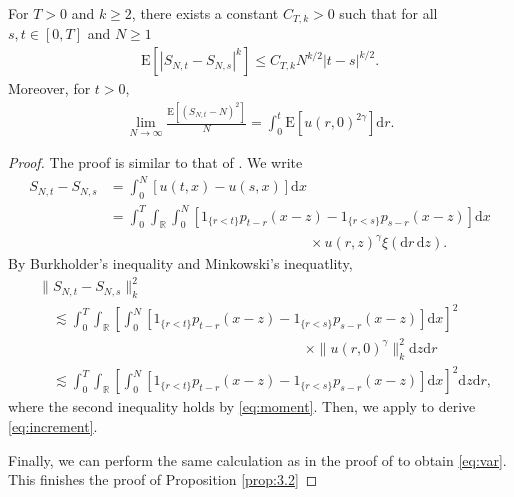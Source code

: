 \documentclass[12pt, reqno]{amsart}
\newcommand{\R}{{\mathbb{R}}}
\newcommand{\E}{\mathrm{E}}
\renewcommand{\d}{\mathrm{d}}
\newcommand{\<}{\langle}
\renewcommand{\>}{\rangle}
\begin{document}
\begin{proposition} \label{prop:3.2}
          For $T>0$ and $k\geq 2$,  there exists a constant $C_{T, k}>0$ such that for all $s, t \in [0, T]$ and $N\geq1$
          \begin{align}\label{eq:increment}
          \E \left[|S_{N,t}- S_{N,s}|^k\right]\leq C_{T,k}N^{k/2}|t-s|^{k/2}.
          \end{align}
          Moreover, for $t>0$,
          \begin{align}\label{eq:var}
          \lim_{N\to\infty}\frac{\E[(S_{N,t}-N)^2]}{N}=  \int_0^t \E\left[u(r,0)^{2\gamma}\right]\d r. 
          \end{align}
\end{proposition}
\begin{proof}
          The proof is similar to that of \cite[Proposition 4.1]{HNV20}. We write
          \begin{align*}
          S_{N,t}-S_{N,s}&= \int_0^N [u(t,x)-u(s,x)]\d x\\
          &=\int_0^T\int_\R \int_0^N\left[1_{\{r<t\}}p_{t-r}(x-z)-1_{\{r<s\}}p_{s-r}(x-z)\right]\d x \\
          &\hspace{6cm} \times u(r,z)^\gamma \xi(\d r\, \d z).
          \end{align*}
          By Burkholder's inequality and Minkowski's inequatlity, 
          \begin{align*}
          &\|S_{N,t}-S_{N,s}\|_k^2 \\
          & \quad \lesssim \int_0^T\int_\R \left[\int_0^N\left[1_{\{r<t\}}p_{t-r}(x-z)-1_{\{r<s\}}p_{s-r}(x-z)\right]\d x\right]^2 \\
          &\hspace{8cm}
          \times\|u(r,0)^{\gamma}\|_k^2  \d z\d r\\
          & \quad \lesssim \int_0^T\int_\R \left[\int_0^N\left[1_{\{r<t\}}p_{t-r}(x-z)-1_{\{r<s\}}p_{s-r}(x-z)\right]\d x\right]^2\d z \d r,
          \end{align*}
          where the second inequality holds by \eqref{eq:moment}. Then, we apply \cite[(4.1)]{HNV20} to derive 
          \eqref{eq:increment}.
          
          Finally, we can perform the same calculation as in the proof of 
\cite[Proposition 3.1]{HNV20} to obtain \eqref{eq:var}.  
This finishes the proof of Proposition \ref{prop:3.2}
\end{proof}
\end{document}
